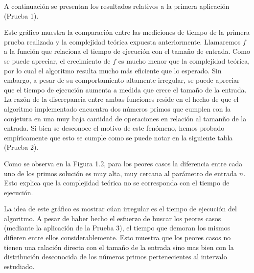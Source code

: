 \documentclass[a4paper,10pt] {article}
\begin{document}
A continuaci\'on se presentan los resultados relativos a la primera aplicaci\'on (Prueba 1).


Este gr\'afico muestra la comparaci\'on entre las mediciones de tiempo de la primera prueba realizada y la complejidad te\'orica expuesta anteriormente. Llamaremos $f$ a la funci\'on que relaciona el tiempo de ejecuci\'on con el tama\~{n}o de entrada. Como se puede apreciar, el crecimiento de $f$ es mucho menor que la complejidad te\'orica, por lo cual el algoritmo resulta mucho m\'as eficiente que lo esperado. Sin embargo, a pesar de su comportamiento altamente irregular, se puede apreciar que el tiempo de ejecuci\'on aumenta a medida que crece el tama\~{n}o de la entrada. La raz\'on de la discrepancia entre ambas funciones reside en el hecho de que el algoritmo implementado encuentra dos n\'umeros primos que cumplen con la conjetura en una muy baja cantidad de operaciones en relaci\'on al taman\~{n}o de la entrada. Si bien se desconoce el motivo de este fen\'omeno, hemos probado emp\'iricamente que esto se cumple como se puede notar en la siguiente tabla (Prueba 2).


Como se observa en la Figura 1.2, para los peores casos la diferencia entre cada uno de los primos soluci\'on es muy alta, muy cercana al par\'ametro de entrada $n$. Esto explica que la complejidad te\'orica no se corresponda con el tiempo de ejecuci\'on.


La idea de este gr\'afico es mostrar c\'uan irregular es el tiempo de ejecuci\'on del algoritmo. A pesar de haber hecho el esfuerzo de buscar los peores casos (mediante la aplicaci\'on de la Prueba 3), el tiempo que demoran los mismos difieren entre ellos considerablemente. Esto muestra que los peores casos no tienen una ralaci\'on directa con el tama\~{n}o de la entrada sino mas bien con la distribuci\'on desconocida de los n\'umeros primos pertenecientes al intervalo estudiado.
\end{document}
